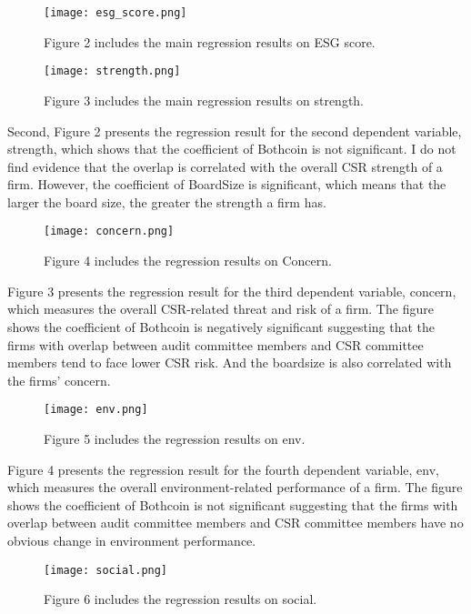 \documentclass{article}
\begin{document}
\begin{figure}
\centering
\texttt{[image: esg\_score.png]}
\caption{\label{fig:ESGscore} Figure 2 includes the main regression results on ESG score.}
\end{figure}


\begin{figure}
\centering
\texttt{[image: strength.png]}
\caption{\label{fig:strength} Figure 3 includes the main regression results on strength.}
\end{figure}
Second, Figure 2 presents the regression result for the second dependent variable, strength, which shows that the coefficient of Bothcoin is not significant. I do not find evidence that the overlap is correlated with the overall CSR strength of a firm. However, the coefficient of BoardSize is significant, which means that the larger the board size, the greater the strength a firm has.


\begin{figure}
\centering
\texttt{[image: concern.png]}
\caption{\label{fig:Concern} Figure 4 includes the regression results on Concern.}
\end{figure}

Figure 3 presents the regression result for the third dependent variable, concern, which measures the overall CSR-related threat and risk of a firm. The figure shows  the coefficient of Bothcoin is negatively significant suggesting that the firms with overlap between audit committee members and CSR committee members tend to face lower CSR risk. And the boardsize is also correlated with the firms' concern. 


\begin{figure}
\centering
\texttt{[image: env.png]}
\caption{\label{fig:env} Figure 5 includes the regression results on env.}
\end{figure}
Figure 4 presents the regression result for the fourth dependent variable, env, which measures the overall environment-related performance of a firm. The figure shows  the coefficient of Bothcoin is not significant suggesting that the firms with overlap between audit committee members and CSR committee members have no obvious change in environment performance. 


\begin{figure}
\centering
\texttt{[image: social.png]}
\caption{\label{fig:env} Figure 6 includes the regression results on social.}
\end{figure}
\end{document}
